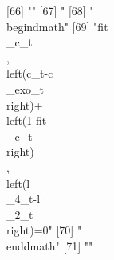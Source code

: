 [66] ""                                                                                                                                                                                                                                                                                                                                            
[67] "%
[68] "\\begin{dmath}"                                                                                                                                                                                                                                                                                                                              
[69] "{{fit\\_c}_{t}}\\, \\left({c_{t}}-{{c\\_exo}_{t}}\\right)+\\left(1-{{fit\\_c}_{t}}\\right)\\, \\left({{l\\_4}_{t}}-{{l\\_2}_{t}}\\right)=0"                                                                                                                                                                                                  
[70] "\\end{dmath}"                                                                                                                                                                                                                                                                                                                                
[71] ""                                                                                                                                                                                                                                                                                                                                            
